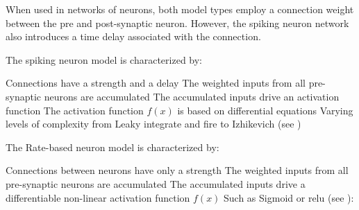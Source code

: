 When used in networks of neurons, both model types employ a connection weight between the pre and post-synaptic neuron.
However, the spiking neuron network also introduces a time delay associated with the connection.

The spiking neuron model \cite{paugam2012computing} is characterized by:
\vspace{-3mm}
\begin{outline}
        \1 Connections have a strength and a delay
\vspace{-3mm}
        \1 The weighted inputs from all pre-synaptic neurons are accumulated
\vspace{-3mm}
        \1 The accumulated inputs drive an activation function
\vspace{-3mm}
          \2 The activation function $f(x)$ is based on differential equations
          \2 Varying levels of complexity from Leaky integrate and fire \cite{Brunel2007} to Izhikevich \cite{Iz2005} (see )
         
\end{outline}

The Rate-based neuron model \cite{NNintro_Bullinaria} is characterized by:
\vspace{-3mm}
\begin{outline}
        \1 Connections between neurons have only a strength
\vspace{-3mm}
        \1 The weighted inputs from all pre-synaptic neurons are accumulated
\vspace{-3mm}
        \1 The accumulated inputs drive a differentiable non-linear activation function $f(x)$
\vspace{-3mm}
          \2 Such as Sigmoid \cite{paugam2012computing} or \ac{relu} \cite{maas2013rectifier} (see ):
\end{outline}


